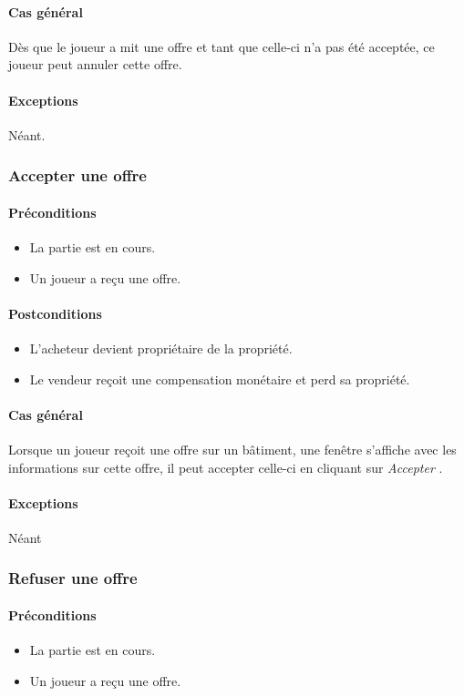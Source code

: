 \documentclass[a4paper,11pt]{report}
\begin{document}
\paragraph{Cas général}
Dès que le joueur a mit une offre et tant que celle-ci n'a pas été acceptée, ce joueur peut annuler cette offre.
\paragraph{Exceptions} Néant.
\subsubsection{Accepter une offre}
\paragraph{Préconditions}
\begin{itemize}
 \item La partie est en cours.
 \item Un joueur a reçu une offre.
\end{itemize}
\paragraph{Postconditions}
\begin{itemize}
 \item L'acheteur devient propriétaire de la propriété.
 \item Le vendeur reçoit une compensation monétaire et perd sa propriété.
\end{itemize}
\paragraph{Cas général}
Lorsque un joueur reçoit une offre sur un bâtiment, une fenêtre s'affiche avec les informations sur cette offre, il peut accepter celle-ci en cliquant sur \og \textit{Accepter} \fg.
\paragraph{Exceptions} Néant
\subsubsection{Refuser une offre}
\paragraph{Préconditions}
\begin{itemize}
 \item La partie est en cours.
 \item Un joueur a reçu une offre.
\end{itemize}
\end{document}

